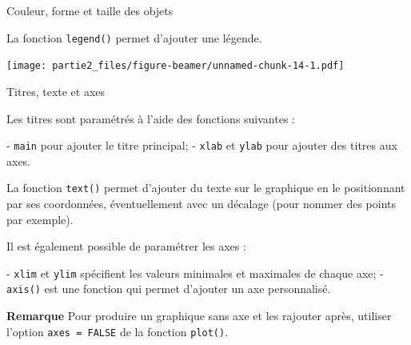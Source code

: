\documentclass[12pt,ignorenonframetext,]{beamer}
\newenvironment{Shaded}{}{}
\newcommand{\KeywordTok}[1]{\textcolor[rgb]{0.00,0.00,1.00}{#1}}
\newcommand{\DataTypeTok}[1]{#1}
\newcommand{\DecValTok}[1]{#1}
\newcommand{\StringTok}[1]{\textcolor[rgb]{0.00,0.50,0.50}{#1}}
\newcommand{\OperatorTok}[1]{#1}
\newcommand{\NormalTok}[1]{#1}
\renewenvironment{Shaded}{\begin{snugshade}}{\end{snugshade}}
\begin{document}
\begin{frame}[fragile]{Couleur, forme et taille des objets}

La fonction \texttt{legend()} permet d'ajouter une légende.
\footnotesize \center

\pause \vspace{-0.4cm}

\begin{Shaded}
\end{Shaded}

\texttt{[image: partie2\_files/figure-beamer/unnamed-chunk-14-1.pdf]}

\end{frame}

\begin{frame}[fragile]{Titres, texte et axes}

Les titres sont paramétrés à l'aide des fonctions suivantes :

\vspace{-0.3cm} - \texttt{main} pour ajouter le titre principal; -
\texttt{xlab} et \texttt{ylab} pour ajouter des titres aux axes.

\pause La fonction \texttt{text()} permet d'ajouter du texte sur le
graphique en le positionnant par ses coordonnées, éventuellement avec un
décalage (pour nommer des points par exemple).

\pause Il est également possible de paramétrer les axes :

\vspace{-0.3cm} - \texttt{xlim} et \texttt{ylim} spécifient les valeurs
minimales et maximales de chaque axe; - \texttt{axis()} est une fonction
qui permet d'ajouter un axe personnalisé.

\pause 

\textbf{Remarque} Pour produire un graphique sans axe et les rajouter
après, utiliser l'option \texttt{axes\ =\ FALSE} de la fonction
\texttt{plot()}.

\end{frame}
\end{document}
